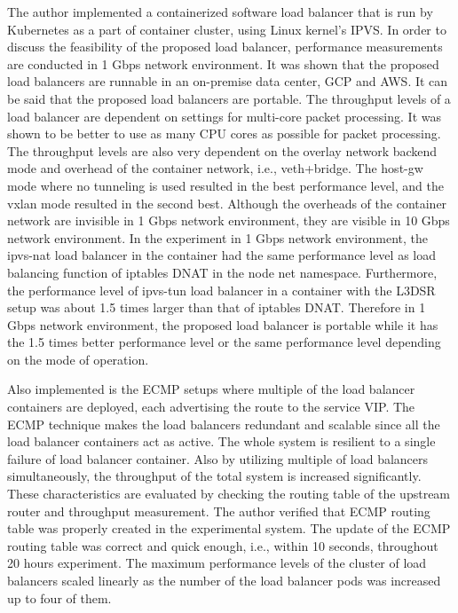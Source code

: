 The author implemented a containerized software load balancer that is run by Kubernetes as a part of container cluster, using Linux kernel's IPVS.
In order to discuss the feasibility of the proposed load balancer, performance measurements are conducted in 1 Gbps network environment.
It was shown that the proposed load balancers are runnable in an on-premise data center, GCP and AWS.
It can be said that the proposed load balancers are portable.
The throughput levels of a load balancer are dependent on settings for multi-core packet processing.
It was shown to be better to use as many CPU cores as possible for packet processing.
The throughput levels are also very dependent on the overlay network backend mode and overhead of the container network, i.e., veth+bridge.
The host-gw mode where no tunneling is used resulted in the best performance level, and the vxlan mode resulted in the second best.
Although the overheads of the container network are invisible in 1 Gbps network environment, they are visible in 10 Gbps network environment.
In the experiment in 1 Gbps network environment, the ipvs-nat load balancer in the container had the same performance level as load balancing function of iptables DNAT in the node net namespace.
Furthermore, the performance level of ipvs-tun load balancer in a container with the L3DSR setup was about 1.5 times larger than that of iptables DNAT.
Therefore in 1 Gbps network environment, the proposed load balancer is portable while it has the 1.5 times better performance level or the same performance level depending on the mode of operation.

Also implemented is the ECMP setups where multiple of the load balancer containers are deployed, each advertising the route to the service VIP.
The ECMP technique makes the load balancers redundant and scalable since all the load balancer containers act as active.
The whole system is resilient to a single failure of load balancer container.
Also by utilizing multiple of load balancers simultaneously, the throughput of the total system is increased significantly.
These characteristics are evaluated by checking the routing table of the upstream router and throughput measurement.
The author verified that ECMP routing table was properly created in the experimental system.
The update of the ECMP routing table was correct and quick enough, i.e., within 10 seconds, throughout 20 hours experiment.
The maximum performance levels of the cluster of load balancers scaled linearly as the number of the load balancer pods was increased up to four of them.

